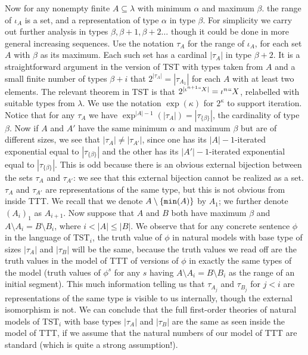\documentclass[112pt]{article}
\begin{document}
Now for any nonempty finite $A \subseteq \lambda$ with minimum $\alpha$ and maximum $\beta$. the range of $\iota_A$ is a set, and a representation of type $\alpha$ in
type $\beta$.  For simplicity we carry out further analysis in types $\beta, \beta+1,\beta+2\ldots$ though it could be done in more general increasing sequences.  Use the notation
$\tau_A$ for the range of $\iota_A$, for each set $A$ with $\beta$ as its maximum.  Each such set has a cardinal $|\tau_A|$ in type $\beta+2$.  It is a straightforward
argument in the version of TST with types taken from $A$ and a small finite number of types $\beta+i$ that $2^{|\tau_A|} = |\tau_{A_1}|$ for each $A$ with at least two elements.
The relevant theorem in TST is that $2^{|\iota^{n+1}``X|} = \iota^n``X$, relabelled with suitable types from $\lambda$.   We use the notation $\exp(\kappa)$ for $2^\kappa$ to support iteration.  Notice that for any $\tau_A$ we have $\exp^{|A|-1}(|\tau_A|) = |\tau_{\{\beta\}}|$, the cardinality of type $\beta$.  Now if $A$ and $A'$ have the same minimum $\alpha$ and maximum $\beta$ 
but are of different sizes, we see that $|\tau_A| \neq |\tau_{A'}|$, since one has its $|A|-1$-iterated exponential equal to $|\tau_{\{\beta\}}|$ and the other has its $|A'|-1$-iterated exponential equal to $|\tau_{\{\beta\}}|$.  This is odd because there is an obvious external bijection between the sets $\tau_A$ and $\tau_{A'}$:  we see that this external bijection cannot be realized as a set.  $\tau_A$ and $\tau_{A'}$ are representations of the same type, but this is not obvious from inside TTT.  We recall that we denote $A \setminus \{{\tt min}(A)\}$ by $A_1$;  we further denote $(A_i)_1$ as $A_{i+1}$.  Now suppose that $A$ and $B$ both have maximum $\beta$ and $A \setminus A_i = B \setminus B_i$, where $i<|A| \leq |B|$.
We observe that for any concrete sentence $\phi$  in the language of TST$_i$, the truth value of $\phi$ in natural models with base type of sizes $|\tau_A|$ and $|\tau_B|$ will be the same, because the truth values we read off are the truth values in the model of TTT of versions of $\phi$ in exactly the same types of the model (truth values of $\phi^s$ for
any $s$ having $A \setminus A_i = B\setminus B_i$ as the range of an initial segment).  This much information telling us that $\tau_{A_j}$ and $\tau_{B_j}$ for $j<i$ are representations of the same type  is visible to us internally, though the external isomorphism is not.  We can conclude that the full first-order theories of natural models of TST$_i$ with base types $|\tau_A|$ and $|\tau_B|$ are
the same as seen inside the model of TTT, if we assume that the natural numbers of our model of TTT are standard (which is quite a strong assumption!).
\end{document}
